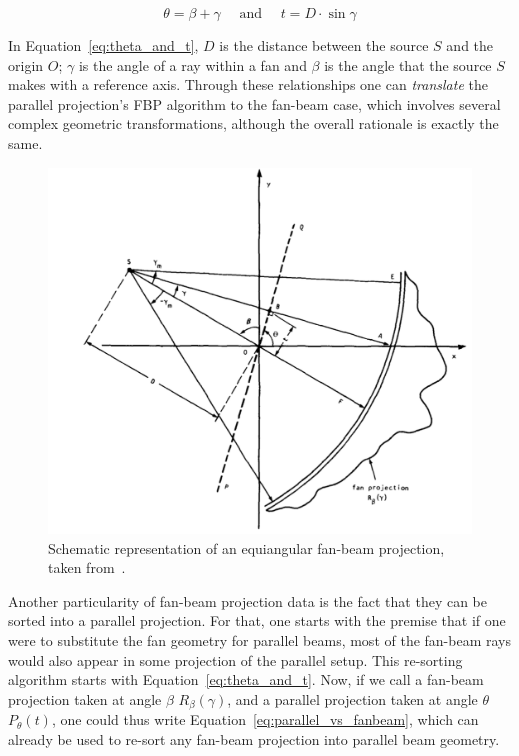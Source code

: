 \begin{equation}
    \label{eq:theta_and_t}
    \theta = \beta + \gamma \quad \text{ and } \quad t = D \cdot \sin \gamma
\end{equation}

In Equation~\ref{eq:theta_and_t}, $D$ is the distance between the source
$S$ and the origin $O$; $\gamma$ is the angle of a ray within a fan and
$\beta$ is the angle that the source $S$ makes with a reference axis.
Through these relationships one can \emph{translate} the parallel
projection's FBP algorithm to the fan-beam case, which involves several
complex geometric transformations, although the overall rationale is
exactly the same.

\begin{figure}[htpb]
    \centering
    \includegraphics[width=.8\textwidth]{img/png/fig319.png}
    \caption{Schematic representation of an equiangular fan-beam
    projection, taken from~\cite{Kak2001}.}
    \label{fig:equiangular}
\end{figure}

Another particularity of fan-beam projection data is the fact that they
can be sorted into a parallel projection. For that, one starts with the
premise that if one were to substitute the fan geometry for parallel
beams, most of the fan-beam rays would also appear in some projection of
the parallel setup. This re-sorting algorithm starts with
Equation~\ref{eq:theta_and_t}. Now, if we call a fan-beam projection
taken at angle $\beta$ $R_{\beta}(\gamma)$, and a parallel projection
taken at angle $\theta$ $P_{\theta}(t)$, one could thus write
Equation~\ref{eq:parallel_vs_fanbeam}, which can already be used to
re-sort any fan-beam projection into parallel beam geometry.

